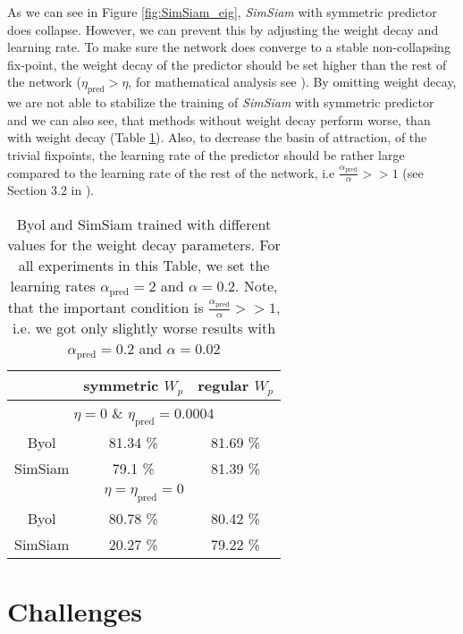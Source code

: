 As we can see in Figure \ref{fig:SimSiam_eig}, \emph{SimSiam} with symmetric predictor does collapse. However, we can prevent this by adjusting the weight decay and learning rate. To make sure the network does converge to a stable non-collapsing fix-point, the weight decay of the predictor should be set higher than the rest of the network ($\eta_{\text{pred}} > \eta$, for mathematical analysis see \cite{tian2021understanding}). By omitting weight decay, we are not able to stabilize the training of \emph{SimSiam} with symmetric predictor and we can also see, that methods without weight decay perform worse, than with weight decay (Table \ref{tab:eta_and_lr}). Also, to decrease the basin of attraction, of the trivial fixpoints, the learning rate of the predictor should be rather large compared to the learning rate of the rest of the network, i.e $\frac{\alpha_{\text{pred}}}{\alpha} >> 1$ (see Section 3.2 in \cite{tian2021understanding}). 

\begin{table}[h]
    \centering
    \begin{tabular}{c|c|c}
         & symmetric $W_p$ & regular $W_p$ \\
         \hline
         \multicolumn{3}{|c|}{$\eta = 0$ \& $\eta_{\text{pred}} = 0.0004$} \\
         \hline
         Byol & 81.34 \% & 81.69 \% \\
         SimSiam & 79.1 \% & 81.39 \% \\
         \hline
         \multicolumn{3}{|c|}{$\eta = \eta_{\text{pred}} = 0$} \\
         \hline
         Byol & 80.78 \% & 80.42 \% \\
         SimSiam & 20.27 \% & 79.22 \% \\
    \end{tabular}
    \caption{Byol and SimSiam trained with different values for the weight decay parameters. For all experiments in this Table, we set the learning rates $\alpha_{\text{pred}} = 2$ and $\alpha = 0.2$. Note, that the important condition is $\frac{\alpha_{\text{pred}}}{\alpha} >> 1$, i.e. we got only slightly worse results with $\alpha_{\text{pred}} = 0.2$ and $\alpha = 0.02$}
    \label{tab:eta_and_lr}
\end{table}

\section{Challenges}
\label{sec:challenges}

